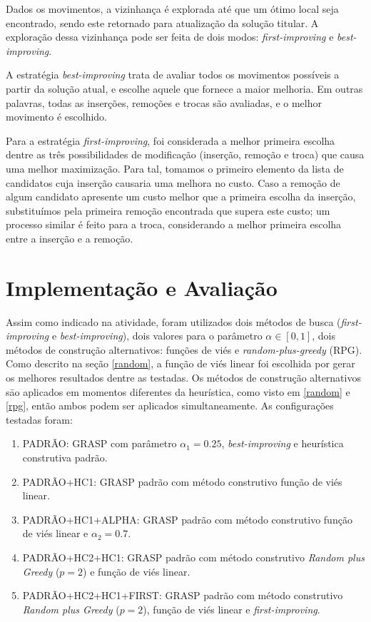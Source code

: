 \documentclass{MO824}
\begin{document}
    Dados os movimentos, a vizinhança é explorada até que um ótimo local seja encontrado, sendo este retornado para atualização da solução titular. A exploração dessa vizinhança pode ser feita de dois modos: \textit{first-improving} e \textit{best-improving}.
    
    A estratégia \textit{best-improving} trata de avaliar todos os movimentos possíveis a partir da solução atual, e escolhe aquele que fornece a maior melhoria. Em outras palavras, todas as inserções, remoções e trocas são avaliadas, e o melhor movimento é escolhido. 
    
    Para a estratégia \textit{first-improving}, foi considerada a melhor primeira escolha dentre as três possibilidades de modificação (inserção, remoção e troca) que causa uma melhor maximização. Para tal, tomamos o primeiro elemento da lista de candidatos cuja inserção causaria uma melhora no custo. Caso a remoção de algum candidato apresente um custo melhor que a primeira escolha da inserção, substituímos pela primeira remoção encontrada que supera este custo; um processo similar é feito para a troca, considerando a melhor primeira escolha entre a inserção e a remoção.


\section{Implementação e Avaliação} \label{imp}
    Assim como indicado na atividade, foram utilizados dois métodos de busca (\textit{first-improving} e \textit{best-improving}), dois valores para o parâmetro $\alpha \in [0,1]$, dois métodos de construção alternativos: funções de viés e \textit{random-plus-greedy} (RPG). Como descrito na seção \ref{random}, a função de viés linear foi escolhida por gerar os melhores resultados dentre as testadas. Os métodos de construção alternativos sāo aplicados em momentos diferentes da heurística, como visto em \ref{random} e \ref{rpg}, então ambos podem ser aplicados simultaneamente. As configurações testadas foram:
\begin{enumerate}
    \item PADRÃO: GRASP com parâmetro $\alpha_1 = 0.25$, \textit{best-improving} e heurística construtiva padrão.
    
    \item PADRÃO+HC1: GRASP padrão com método construtivo função de viés linear.
    
    \item PADRÃO+HC1+ALPHA: GRASP padrão com método construtivo função de viés linear e $\alpha_2 = 0.7$.
    
    \item PADRÃO+HC2+HC1: GRASP padrão com método construtivo \textit{Random plus Greedy} ($p = 2$) e função de viés linear.
    
    \item PADRÃO+HC2+HC1+FIRST: GRASP padrão com método construtivo \textit{Random plus Greedy} ($p = 2$), função de viés linear e \textit{first-improving}.
\end{enumerate}
\end{document}
